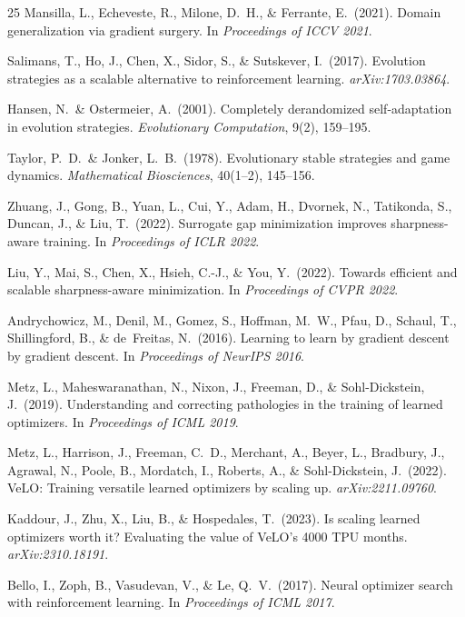 \documentclass[12pt]{article}
\begin{document}
\begin{thebibliography}{25}
Mansilla, L., Echeveste, R., Milone, D.~H., \& Ferrante, E.\ (2021).
Domain generalization via gradient surgery.
In \textit{Proceedings of ICCV 2021}.

Salimans, T., Ho, J., Chen, X., Sidor, S., \& Sutskever, I.\ (2017).
Evolution strategies as a scalable alternative to reinforcement learning.
\textit{arXiv:1703.03864}.

Hansen, N.\ \& Ostermeier, A.\ (2001).
Completely derandomized self-adaptation in evolution strategies.
\textit{Evolutionary Computation}, 9(2), 159--195.

Taylor, P.~D.\ \& Jonker, L.~B.\ (1978).
Evolutionary stable strategies and game dynamics.
\textit{Mathematical Biosciences}, 40(1--2), 145--156.

Zhuang, J., Gong, B., Yuan, L., Cui, Y., Adam, H., Dvornek, N.,
Tatikonda, S., Duncan, J., \& Liu, T.\ (2022).
Surrogate gap minimization improves sharpness-aware training.
In \textit{Proceedings of ICLR 2022}.

Liu, Y., Mai, S., Chen, X., Hsieh, C.-J., \& You, Y.\ (2022).
Towards efficient and scalable sharpness-aware minimization.
In \textit{Proceedings of CVPR 2022}.

Andrychowicz, M., Denil, M., Gomez, S., Hoffman, M.~W., Pfau, D.,
Schaul, T., Shillingford, B., \& de~Freitas, N.\ (2016).
Learning to learn by gradient descent by gradient descent.
In \textit{Proceedings of NeurIPS 2016}.

Metz, L., Maheswaranathan, N., Nixon, J., Freeman, D., \&
Sohl-Dickstein, J.\ (2019).
Understanding and correcting pathologies in the training of learned
optimizers.
In \textit{Proceedings of ICML 2019}.

Metz, L., Harrison, J., Freeman, C.~D., Merchant, A., Beyer, L.,
Bradbury, J., Agrawal, N., Poole, B., Mordatch, I., Roberts, A.,
\& Sohl-Dickstein, J.\ (2022).
VeLO: Training versatile learned optimizers by scaling up.
\textit{arXiv:2211.09760}.

Kaddour, J., Zhu, X., Liu, B., \& Hospedales, T.\ (2023).
Is scaling learned optimizers worth it? Evaluating the value of
VeLO's 4000 TPU months.
\textit{arXiv:2310.18191}.

Bello, I., Zoph, B., Vasudevan, V., \& Le, Q.~V.\ (2017).
Neural optimizer search with reinforcement learning.
In \textit{Proceedings of ICML 2017}.

\end{thebibliography}
\end{document}
